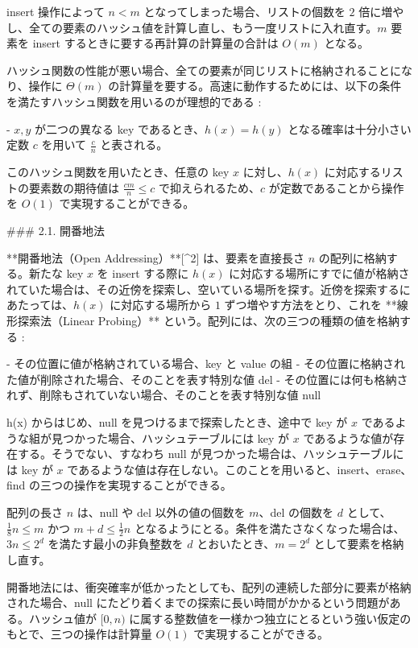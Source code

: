 insert 操作によって $n < m$ となってしまった場合、リストの個数を $2$ 倍に増やし、全ての要素のハッシュ値を計算し直し、もう一度リストに入れ直す。$m$ 要素を insert するときに要する再計算の計算量の合計は $O(m)$ となる。

ハッシュ関数の性能が悪い場合、全ての要素が同じリストに格納されることになり、操作に $\Theta (m)$ の計算量を要する。高速に動作するためには、以下の条件を満たすハッシュ関数を用いるのが理想的である :

- $x, y$ が二つの異なる key であるとき、$h(x) = h(y)$ となる確率は十分小さい定数 $c$ を用いて $\displaystyle \frac{c}{n}$ と表される。

このハッシュ関数を用いたとき、任意の key $x$ に対し、$h(x)$ に対応するリストの要素数の期待値は $\displaystyle \frac{cm}{n} \leq c$ で抑えられるため、$c$ が定数であることから操作を $O(1)$ で実現することができる。

### 2.1. 開番地法

**開番地法（Open Addressing）**[^2] は、要素を直接長さ $n$ の配列に格納する。新たな key $x$ を insert する際に $h(x)$ に対応する場所にすでに値が格納されていた場合は、その近傍を探索し、空いている場所を探す。近傍を探索するにあたっては、$h(x)$ に対応する場所から $1$ ずつ増やす方法をとり、これを **線形探索法（Linear Probing）** という。配列には、次の三つの種類の値を格納する :

- その位置に値が格納されている場合、key と value の組
- その位置に格納された値が削除された場合、そのことを表す特別な値 del
- その位置には何も格納されず、削除もされていない場合、そのことを表す特別な値 null

h(x) からはじめ、null を見つけるまで探索したとき、途中で key が $x$ であるような組が見つかった場合、ハッシュテーブルには key が $x$ であるような値が存在する。そうでない、すなわち null が見つかった場合は、ハッシュテーブルには key が $x$ であるような値は存在しない。このことを用いると、insert、erase、find の三つの操作を実現することができる。

配列の長さ $n$ は、null や del 以外の値の個数を $m$、del の個数を $d$ として、$\displaystyle \frac{1}{8} n \leq m$ かつ $\displaystyle m+d \leq \frac{1}{2} n$ となるようにとる。条件を満たさなくなった場合は、$3n \leq 2^d$ を満たす最小の非負整数を $d$ とおいたとき、$m = 2^d$ として要素を格納し直す。

開番地法には、衝突確率が低かったとしても、配列の連続した部分に要素が格納された場合、null にたどり着くまでの探索に長い時間がかかるという問題がある。ハッシュ値が $[0, n)$ に属する整数値を一様かつ独立にとるという強い仮定のもとで、三つの操作は計算量 $O(1)$ で実現することができる。

